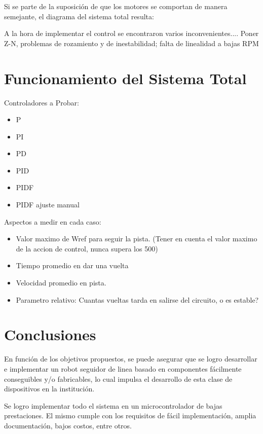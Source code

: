 \documentclass[10pt,conference,a4paper,onecolumn]{article}%
\begin{document}
Si se parte de la suposición de que los motores se comportan de manera semejante, el diagrama del sistema total resulta:



A la hora de implementar el control se encontraron varios inconvenientes.... Poner Z-N, problemas de rozamiento y de inestabilidad; falta de linealidad a bajas RPM

\section{Funcionamiento del Sistema Total}
\label{sec:resultados}
Controladores a Probar:
\begin{itemize}
 \item P
 \item PI
 \item PD
 \item PID
 \item PIDF
 \item PIDF ajuste manual
\end{itemize}
Aspectos a medir en cada caso:
\begin{itemize}
\item Valor maximo de Wref para seguir la pista. (Tener en cuenta el valor maximo de la accion de control, nunca supera los 500)
\item Tiempo promedio en dar una vuelta
\item Velocidad promedio en pista.
\item Parametro relativo: Cuantas vueltas tarda en salirse del circuito, o es estable?
\end{itemize}



\section{Conclusiones}
\label{sec:conclusiones}
En función de los objetivos propuestos, se puede asegurar que se logro desarrollar e implementar un robot seguidor de linea basado en componentes fácilmente conseguibles y/o fabricables, lo cual impulsa el desarrollo de esta clase de dispositivos en la institución. 

Se logro implementar todo el sistema en un microcontrolador de bajas prestaciones. El mismo cumple con los requisitos de fácil implementación, amplia documentación, bajos costos, entre otros.  
\end{document}
